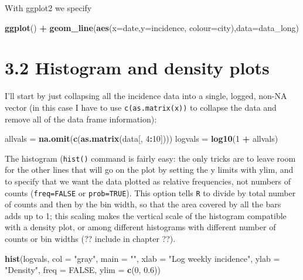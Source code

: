 \documentclass[11pt,]{article}
\newenvironment{Shaded}{\begin{snugshade}}{\end{snugshade}}
\newcommand{\KeywordTok}[1]{\textcolor[rgb]{0.13,0.29,0.53}{\textbf{#1}}}
\newcommand{\DataTypeTok}[1]{\textcolor[rgb]{0.13,0.29,0.53}{#1}}
\newcommand{\DecValTok}[1]{\textcolor[rgb]{0.00,0.00,0.81}{#1}}
\newcommand{\FloatTok}[1]{\textcolor[rgb]{0.00,0.00,0.81}{#1}}
\newcommand{\StringTok}[1]{\textcolor[rgb]{0.31,0.60,0.02}{#1}}
\newcommand{\OtherTok}[1]{\textcolor[rgb]{0.56,0.35,0.01}{#1}}
\newcommand{\OperatorTok}[1]{\textcolor[rgb]{0.81,0.36,0.00}{\textbf{#1}}}
\newcommand{\NormalTok}[1]{#1}
\begin{document}
With ggplot2 we specify

\begin{Shaded}
\begin{Highlighting}[]
\KeywordTok{ggplot}\NormalTok{() }\OperatorTok{+}
\StringTok{  }\KeywordTok{geom_line}\NormalTok{(}\KeywordTok{aes}\NormalTok{(}\DataTypeTok{x=}\NormalTok{date,}\DataTypeTok{y=}\NormalTok{incidence, }\DataTypeTok{colour=}\NormalTok{city),}\DataTypeTok{data=}\NormalTok{data_long)}
\end{Highlighting}
\end{Shaded}

\section{3.2 Histogram and density
plots}\label{histogram-and-density-plots}

I'll start by just collapsing all the incidence data into a single,
logged, non-NA vector (in this case I have to use
\texttt{c(as.matrix(x))} to collapse the data and remove all of the data
frame information):

\begin{Shaded}
\begin{Highlighting}[]
\NormalTok{allvals =}\StringTok{ }\KeywordTok{na.omit}\NormalTok{(}\KeywordTok{c}\NormalTok{(}\KeywordTok{as.matrix}\NormalTok{(data[, }\DecValTok{4}\OperatorTok{:}\DecValTok{10}\NormalTok{])))}
\NormalTok{logvals =}\StringTok{ }\KeywordTok{log10}\NormalTok{(}\DecValTok{1} \OperatorTok{+}\StringTok{ }\NormalTok{allvals)}
\end{Highlighting}
\end{Shaded}

The histogram (\texttt{hist()} command is fairly easy: the only tricks
are to leave room for the other lines that will go on the plot by
setting the y limits with ylim, and to specify that we want the data
plotted as relative frequencies, not numbers of counts
(\texttt{freq=FALSE} or \texttt{prob=TRUE}). This option tells
\texttt{R} to divide by total number of counts and then by the bin
width, so that the area covered by all the bars adds up to 1; this
scaling makes the vertical scale of the histogram compatible with a
density plot, or among different histograms with different number of
counts or bin widths (?? include in chapter ??).

\begin{Shaded}
\begin{Highlighting}[]
\KeywordTok{hist}\NormalTok{(logvals, }\DataTypeTok{col =} \StringTok{"gray"}\NormalTok{, }\DataTypeTok{main =} \StringTok{""}\NormalTok{, }\DataTypeTok{xlab =} \StringTok{"Log weekly incidence"}\NormalTok{,}
 \DataTypeTok{ylab =} \StringTok{"Density"}\NormalTok{, }\DataTypeTok{freq =} \OtherTok{FALSE}\NormalTok{, }\DataTypeTok{ylim =} \KeywordTok{c}\NormalTok{(}\DecValTok{0}\NormalTok{, }\FloatTok{0.6}\NormalTok{))}
\end{Highlighting}
\end{Shaded}
\end{document}

